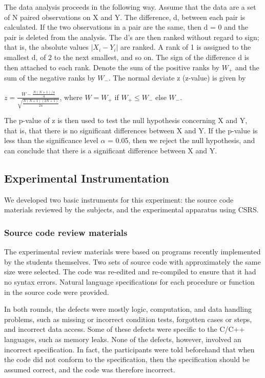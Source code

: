 The data analysis proceeds in the following way. Assume that the data are a
set of N paired observations on X and Y. The difference, d, between each
pair is calculated.  If the two observations in a pair are the same, then d
= 0 and the pair is deleted from the analysis. The d's are then ranked
without regard to sign; that is, the absolute values $|X_{i} - Y_{i}|$ are
ranked. A rank of 1 is assigned to the smallest d, of 2 to the next
smallest, and so on. The sign of the difference d is then attached to each
rank. Denote the sum of the positive ranks by $W_{+}$ and the sum of the
negative ranks by $W_{-}$. The normal deviate z (z-value) is given by

\small
 \( z = \frac{W - \frac{N(N+1)/4}{4}}{\sqrt{\frac{N(N+1)(2N+1)}{24}}} \),
where $W = W_{+}$ if $W_{+} \leq W_{-}$ else $W_{-}$.

\normalsize

The p-value of z is then used to test the null hypothesis concerning X and
Y, that is, that there is no significant differences between X and Y.  If
the p-value is less than the significance level $\alpha$ = 0.05, then we
reject the null hypothesis, and can conclude that there is a significant
difference between X and Y.

\subsection{Experimental Instrumentation}

We developed two basic instruments for this experiment: the source
code materials reviewed by the subjects, and the experimental apparatus
using CSRS. 

\subsubsection{Source code review materials}

The experimental review materials were based on programs recently
implemented by the students themselves.  Two sets of source code with
approximately the same size were selected.  The code was re-edited and
re-compiled to ensure that it had no syntax errors.  Natural language
specifications for each procedure or function in the source code were
provided.

In both rounds, the defects were mostly logic, computation, and data
handling problems, such as missing or incorrect condition tests, forgotten
cases or steps, and incorrect data access. Some of these defects were
specific to the C/C++ languages, such as memory leaks.  None of the defects,
however, involved an incorrect specification. In fact, the participants
were told beforehand that when the code did not conform to the
specification, then the specification should be assumed correct, and the
code was therefore incorrect.


